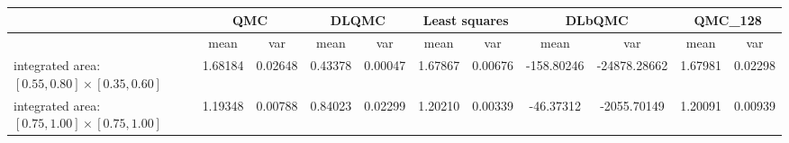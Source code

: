 \begin{tabular}{|l|c|c|c|c|c|c|c|c|c|c|}
\hline
 &\multicolumn{2}{c|}{\textbf{QMC}}&\multicolumn{2}{c|}{\textbf{DLQMC}}&\multicolumn{2}{c|}{\textbf{Least squares}}&\multicolumn{2}{c|}{\textbf{DLbQMC}}&\multicolumn{2}{c|}{\textbf{QMC\_128}}\\ 
\hline

 &mean&var&mean&var&mean&var&mean&var&mean&var\\ 
\hline
integrated area: $[0.55,0.80]\times [0.35,0.60]$ &1.68184&0.02648&0.43378&0.00047&1.67867&0.00676&-158.80246&-24878.28662&1.67981&0.02298\\ 
\hline
integrated area: $[0.75,1.00]\times [0.75,1.00]$ &1.19348&0.00788&0.84023&0.02299&1.20210&0.00339&-46.37312&-2055.70149&1.20091&0.00939\\ 
\hline
\end{tabular}

